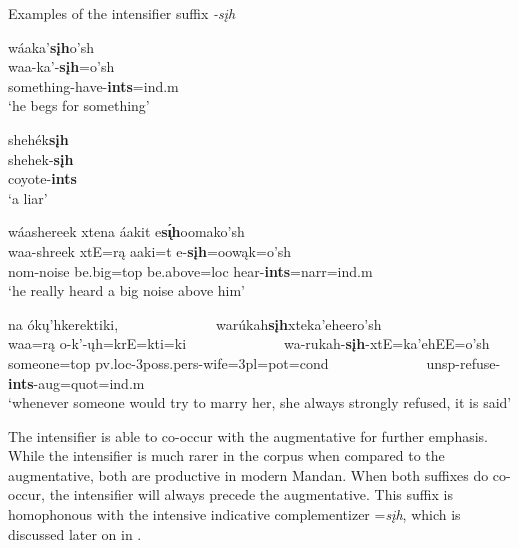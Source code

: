 \begin{exe}
\item\label{Ch3ExSIH} Examples of the intensifier suffix \textit{-sįh}

	\begin{xlist}
	
	\item \glll wáaka'\textbf{sįh}o'sh\\
	waa-ka'-\textbf{sįh}=o'sh\\
	\textnormal{something}-\textnormal{have}-\textbf{ints}=ind.m\\
	\glt `he begs for something' \citep[210]{hollow1970}
	
	\item \glll shehék\textbf{sįh}\\
	shehek-\textbf{sįh}\\
	\textnormal{coyote}-\textbf{ints}\\
	\glt `a liar' \citep[210]{hollow1970}
	
	\item \glll wáashereek xtena áakit e\textbf{s\'{ı̨}h}oomako'sh\\
	waa-shreek xtE=rą aaki=t e-\textbf{sįh}=oowąk=o'sh\\
	nom-\textnormal{noise} \textnormal{be.big}=top \textnormal{be.above}=loc \textnormal{hear}-\textbf{ints}=narr=ind.m\\
	\glt `he really heard a big noise above him' \citep[281]{hollow1973b}
	
		\item {}na ókų'hkerektiki, ~ ~ ~ ~ ~ ~ ~ ~ warúkah\textbf{sįh}xteka'eheero'sh\\
	waa=rą o-k'-ųh=krE=kti=ki ~ ~ ~ ~ ~ ~ ~ ~ wa-rukah-\textbf{sįh}-xtE=ka'ehEE=o'sh\\
	\textnormal{someone}=top pv.loc-3poss.pers-\textnormal{wife}=3pl=pot=cond ~ ~ ~ ~ ~ ~ ~ ~ unsp-\textnormal{refuse}-\textbf{ints}-aug=quot=ind.m\\
	\glt `whenever someone would try to marry her, she always strongly refused, it is said' \citep[101]{hollow1973a} 
	
	\end{xlist}

\end{exe}

The intensifier is able to co-occur with the augmentative for further emphasis. While the intensifier is much rarer in the corpus when compared to the augmentative, both are productive in modern Mandan. When both suffixes do co-occur, the intensifier will always precede the augmentative. This suffix is homophonous with the intensive indicative complementizer =\textit{sįh}, which is discussed later on in .

